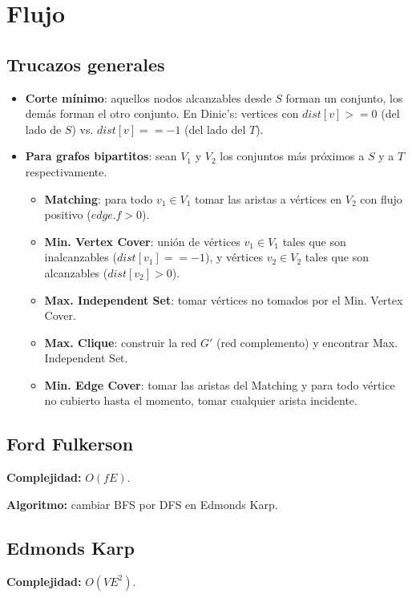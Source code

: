 {\section{Flujo}%
\subsection{Trucazos generales}
\begin{itemize}
\item \textbf{Corte mínimo}: aquellos nodos alcanzables desde $S$ forman un conjunto, los demás forman el otro conjunto.
En Dinic's: vertices con $dist[v] >= 0$ (del lado de $S$) vs.  $dist[v] == -1$ (del lado del $T$).
\item \textbf{Para grafos bipartitos}: sean $V_1$ y $V_2$ los conjuntos más próximos a $S$ y a $T$ respectivamente.
	\begin{itemize}
	\item \textbf{Matching}: para todo $v_1 \in V_1$ tomar las aristas a vértices en $V_2$ con flujo positivo ($edge.f > 0$).
	\item \textbf{Min. Vertex Cover}: unión de vértices $v_1 \in V_1$ tales que son inalcanzables ($dist[v_1] == -1$),
	y vértices $v_2 \in V_2$ tales que son alcanzables ($dist[v_2] > 0$).
	\item \textbf{Max. Independent Set}: tomar vértices no tomados por el Min. Vertex Cover.
	\item \textbf{Max. Clique}: construir la red $G'$ (red complemento) y encontrar Max. Independent Set.
	\item \textbf{Min. Edge Cover}: tomar las aristas del Matching y para todo vértice no cubierto hasta el momento, 
	tomar cualquier arista incidente.
	\end{itemize}
\end{itemize}

\subsection{Ford Fulkerson}
\textbf{Complejidad: } $O(fE)$.

\textbf{Algoritmo: } cambiar BFS por DFS en Edmonds Karp.

\subsection{Edmonds Karp}
\textbf{Complejidad: } $O(VE^2)$.

}
